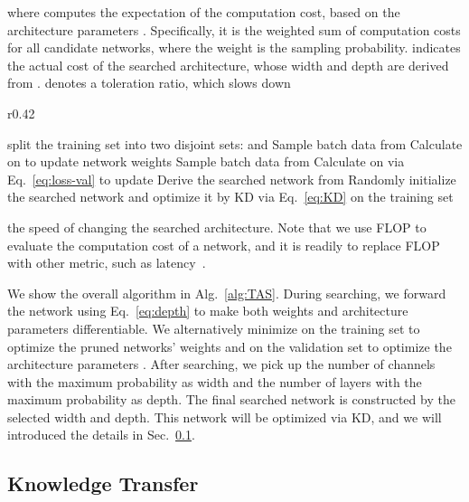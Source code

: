 \documentclass{article}
\def\Secref#1{Sec.~\ref{#1}}
\def\Algref#1{Alg.~\ref{#1}}
\def\Eqref#1{Eq.~\eqref{#1}}
\def\NAME{{TAS}}
\begin{document}
where  computes the expectation of the computation cost, based on the architecture parameters .
Specifically, it is the weighted sum of computation costs for all candidate networks, where the weight is the sampling probability.
 indicates the actual cost of the searched architecture, whose width and depth are derived from .
 denotes a toleration ratio, which slows down
\begin{wrapfigure}{r}{0.42\textwidth}
\begin{minipage}{0.42\textwidth}
  \vspace{-8mm}
  \begin{algorithm}[H]
  \caption{The {\NAME} Procedure}
  \label{alg:TAS}
  \begin{algorithmic}[1]
    \REQUIRE split the training set into two disjoint sets:  and 
    	  \STATE Sample batch data  from 
    	  \STATE Calculate  on  to update network weights
    	  \STATE Sample batch data  from 
    	  \STATE Calculate  on  via \Eqref{eq:loss-val} to update 
    \ENDWHILE
    \STATE Derive the searched network from 
    \STATE Randomly initialize the searched network and optimize it by KD via \Eqref{eq:KD} on the training set
  \end{algorithmic}
  \end{algorithm}
  \vspace{-12mm}
\end{minipage}
\end{wrapfigure}
the speed of changing the searched architecture.
Note that we use FLOP to evaluate the computation cost of a network, and it is readily to replace FLOP with other metric, such as latency~\cite{cai2018proxylessnas}.


We show the overall algorithm in \Algref{alg:TAS}.
During searching, we forward the network using \Eqref{eq:depth} to make both weights and architecture parameters differentiable.
We alternatively minimize  on the training set to optimize the pruned networks' weights and  on the validation set to optimize the architecture parameters .
After searching, we pick up the number of channels with the maximum probability as width and the number of layers with the maximum probability as depth.
The final searched network is constructed by the selected width and depth.
This network will be optimized via KD, and we will introduced the details in \Secref{sec:method-KD}.





\subsection{Knowledge Transfer}\label{sec:method-KD}
\end{document}
